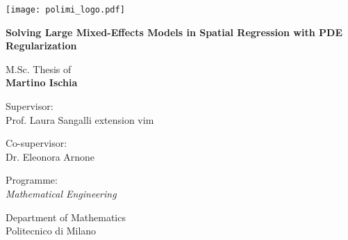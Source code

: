 
\newcommand{\myName}{Martino Ischia}
\newcommand{\myTitle}{Solving Large Mixed-Effects Models in Spatial Regression with PDE Regularization}
\newcommand{\myDegree}{Programme: \protect\\ \textit{Mathematical Engineering}}
\newcommand{\myDepartment}{Department of Mathematics}
\newcommand{\myUni}{Politecnico di Milano}
\newcommand{\myYear}{2023}
\newcommand{\myTime}{01 Feb \myYear}

\begin{titlepage}
	\texttt{[image: polimi\_logo.pdf]}
    \begin{addmargin}[3cm]{-1cm}
		\setlength{\parindent}{0pt}
		\vfill
		
		{
            \Huge\bfseries\myTitle 
            \par
        }
        
        \vspace{2cm}
        
        {\Large M.Sc. Thesis of\\[0.125cm]}
        {\LARGE\bfseries\myName}
        
        \vspace{1cm}
        
        \large
        Supervisor:\\[0.125cm]
        {\Large Prof. Laura Sangalli}
       extension vim 
        \vspace{0.5cm}
        
        \large
        Co-supervisor:\\[0.125cm]
        {\Large Dr. Eleonora Arnone}
        
        \vspace{2cm}
        
       	\myDegree
	    	
	    \vspace{0.5cm}
	     
	    \myDepartment \\
	    \myUni
        
        \vfill
    \end{addmargin}
\end{titlepage}
